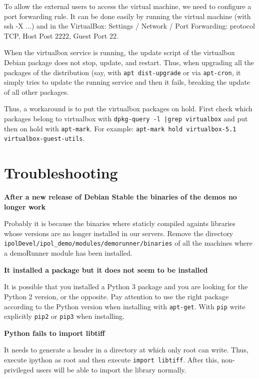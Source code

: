 \documentclass[a4paper,12pt]{article}
\begin{document}
To allow the external users to access the virtual machine, we need to configure a port forwarding rule.
It can be done easily by running the virtual machine (with ssh -X ...) and in the VirtualBox: Settings / Network / Port Forwarding: protocol TCP, Host Post 2222, Guest Port 22.

\vspace{0.25cm}
When the virtualbox service is running, the update script of the virtualbox Debian package does not stop, update, and restart. Thus, when upgrading all the packages of the distribution (say, with {\tt apt dist-upgrade} or via {\tt apt-cron}, it simply tries to update the running service and then it fails, breaking the update of all other packages.

Thus, a workaround is to put the virtualbox packages on hold. First check which packages belong to virtualbox with {\tt dpkg-query -l |grep virtualbox} and put then on hold with {\tt apt-mark}. For example: {\tt apt-mark hold virtualbox-5.1 virtualbox-guest-utils}.

\section{Troubleshooting}

\textbf{After a new release of Debian Stable the binaries of the demos no longer work}

Probably it is because the binaries where staticly compiled againts libraries whose versions are no longer installed in our servers. Remove the directory {\tt ipolDevel/ipol\_demo/modules/demorunner/binaries} of all the machines where a demoRunner module has been installed.
\vspace{0.5cm}

\textbf{It installed a package but it does not seem to be installed}

It is possible that you installed a Python 3 package and you are looking for the Python 2 version, or the opposite. Pay attention to use the right package according to the Python version when installing with {\tt apt-get}. With {\tt pip} write explicitly {\tt pip2} or {\tt pip3} when installing.
\vspace{0.5cm}


\textbf{Python fails to import libtiff}

It needs to generate a header in a directory at which only root can write. Thus, execute ipython as root and then execute {\tt import libtiff}. After this, non-privileged users will be able to import the library normally.
\vspace{0.5cm}
\end{document}
